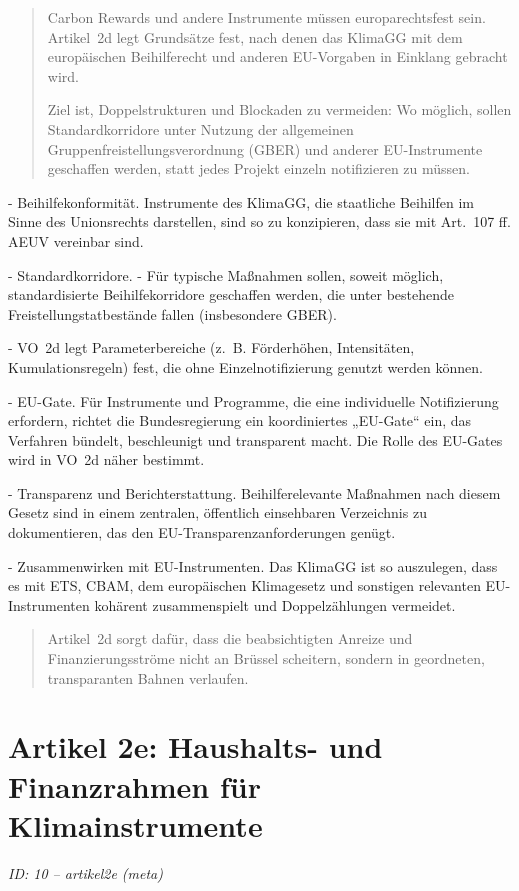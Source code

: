\documentclass[12pt,a4paper]{scrartcl}
\begin{document}
\begin{quote}
Carbon Rewards und andere Instrumente müssen europarechtsfest sein. Artikel 2d legt Grundsätze fest, nach denen das KlimaGG mit dem europäischen Beihilferecht und anderen EU-Vorgaben in Einklang gebracht wird.

Ziel ist, Doppelstrukturen und Blockaden zu vermeiden: Wo möglich, sollen Standardkorridore unter Nutzung der allgemeinen Gruppenfreistellungsverordnung (GBER) und anderer EU-Instrumente geschaffen werden, statt jedes Projekt einzeln notifizieren zu müssen.
\end{quote}

- Beihilfekonformität. Instrumente des KlimaGG, die staatliche Beihilfen im Sinne des Unionsrechts darstellen, sind so zu konzipieren, dass sie mit Art. 107 ff. AEUV vereinbar sind.

- Standardkorridore.
- Für typische Maßnahmen sollen, soweit möglich, standardisierte Beihilfekorridore geschaffen werden, die unter bestehende Freistellungstatbestände fallen (insbesondere GBER).

- VO 2d legt Parameterbereiche (z. B. Förderhöhen, Intensitäten, Kumulationsregeln) fest, die ohne Einzelnotifizierung genutzt werden können.

- EU-Gate. Für Instrumente und Programme, die eine individuelle Notifizierung erfordern, richtet die Bundesregierung ein koordiniertes „EU-Gate“ ein, das Verfahren bündelt, beschleunigt und transparent macht. Die Rolle des EU-Gates wird in VO 2d näher bestimmt.

- Transparenz und Berichterstattung. Beihilferelevante Maßnahmen nach diesem Gesetz sind in einem zentralen, öffentlich einsehbaren Verzeichnis zu dokumentieren, das den EU-Transparenzanforderungen genügt.

- Zusammenwirken mit EU-Instrumenten. Das KlimaGG ist so auszulegen, dass es mit ETS, CBAM, dem europäischen Klimagesetz und sonstigen relevanten EU-Instrumenten kohärent zusammenspielt und Doppelzählungen vermeidet.

{\footnotesize\begin{quote}
Artikel 2d sorgt dafür, dass die beabsichtigten Anreize und Finanzierungsströme nicht an Brüssel scheitern, sondern in geordneten, transparanten Bahnen verlaufen.
\end{quote}}



\section[Artikel 2e: Haushalts- und Finanzrahmen für Klimainstrumente]{Artikel 2e: Haushalts- und Finanzrahmen für Klimainstrumente}
\noindent\textit{ID: 10 -- artikel2e (meta)}
\end{document}
